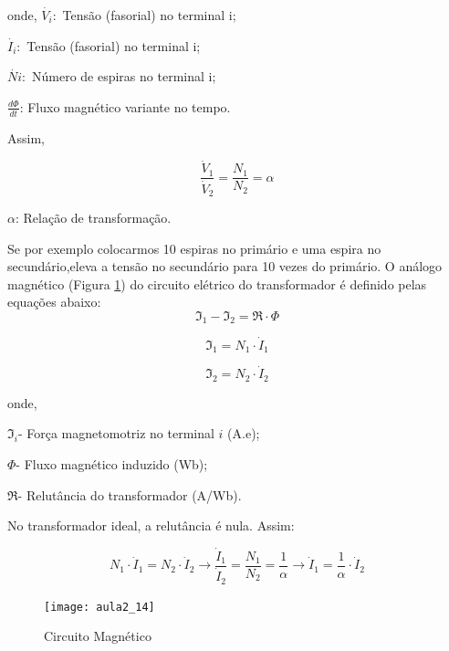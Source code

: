onde,
$\dot{V_{i}}:$ Tensão (fasorial) no terminal i;

$\dot{I_{i}}:$ Tensão (fasorial) no terminal i;

$\dot{Ni}:$ Número de espiras no terminal i;

$\frac{d\Phi}{dt}$: Fluxo magnético variante no tempo.

Assim,

\begin{equation}\label{eq:lf2}
\frac{\dot{V}_{1}}{\dot{V}_{2}}=\frac{N_{1}}{N_{2}}=\alpha
\end{equation}

$\alpha$: Relação de transformação.

Se por exemplo colocarmos 10 espiras no primário e uma espira no secundário,eleva
a tensão no secundário para 10 vezes do primário. 
O análogo magnético (Figura \ref{fig:aula2_14}) do circuito elétrico do transformador é definido pelas equações abaixo:
\begin{equation}\label{eq:cet1}
\Im_{1}-\Im_{2}=\Re\cdot\Phi
\end{equation}

\begin{equation}\label{eq:cet2}
\Im_{1}=N_{1}\cdot\dot{I}_{1}
\end{equation}

\begin{equation}\label{eq:cet3}
\Im_{2}=N_{2}\cdot\dot{I}_{2}
\end{equation}


onde, 

$\Im_{i}$- Força magnetomotriz no terminal $i$ (A.e);

$\Phi$- Fluxo magnético induzido (Wb);

$\Re$- Relutância do transformador (A/Wb).

No transformador ideal, a relutância é nula. Assim:

\begin{equation}\label{eq:cet4}
N_{1}\cdot\dot{I}_{1}=N_{2}\cdot\dot{I}_{2}\rightarrow\frac{\dot{I}_{1}}{\dot{I}_{2}}=\frac{N_{1}}{N_{2}}=\frac{1}{\alpha}\rightarrow\dot{I}_{1}=\frac{1}{\alpha}\cdot\dot{I}_{2}
\end{equation}

\begin{figure}[H]
\begin{centering}
\texttt{[image: aula2\_14]}\protect\caption{\label{fig:aula2_14}Circuito Magnético}
\end{centering}
\end{figure}

